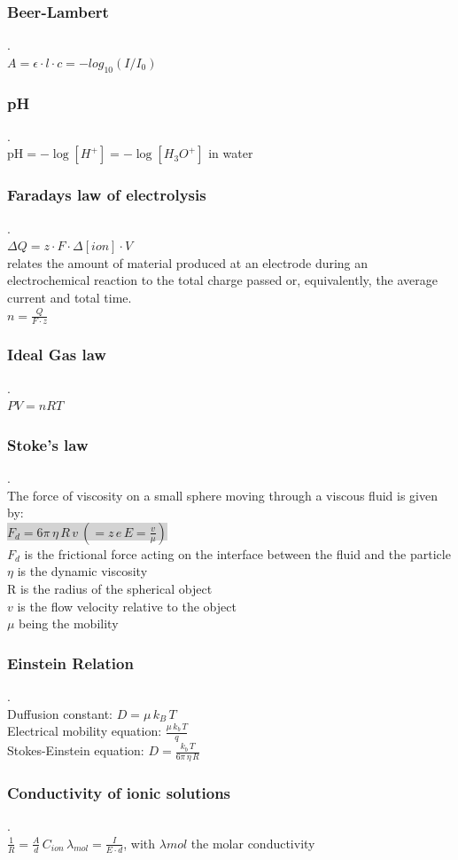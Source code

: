 \documentclass[9pt]{article}
\newcommand{\grey}[1]{\setlength{\fboxsep}{0pt}\colorbox{lightgrey}{#1}}
\begin{document}
\begin{multicols}{2}
\subsubsection{Beer-Lambert}.\\
$A=\epsilon\cdot l\cdot c=-log_{10}(I/I_0)$\\
\subsubsection{pH}.\\
pH$= -\log [H^+] =-\log [H_3 O^+] $ in water\\
\subsubsection{Faradays law of electrolysis} \label{Faradays law of electrolysis}.\\
$\Delta Q= z\cdot F\cdot \Delta [ion]\cdot V$\\
relates the amount of material produced at an electrode during an electrochemical reaction to the total charge passed or, equivalently, the average current and total time.\\
$n=\frac{Q}{F\cdot z}$
\subsubsection{Ideal Gas law}.\\
$PV=nRT$\\
\subsubsection{Stoke's law}.\\
The force of viscosity on a small sphere moving through a viscous fluid is given by:\\
 \grey{$F_{d}=6\pi \,\eta \,R\,v\  (= z\, e\, E=\frac{v}{\mu})$}\\
$F_d$ is the frictional force acting on the interface between the fluid and the particle\\
$\eta $ is the dynamic viscosity \\
R is the radius of the spherical object\\
$v$ is the flow velocity relative to the object\\
$\mu$ being the mobility\\
\subsubsection{Einstein Relation}.\\
Duffusion constant: $D= \mu \,  k_B\, T$\\
Electrical mobility equation: $\frac{\mu \, k_b\, T }{q}$\\
Stokes-Einstein equation: $D=\frac{k_b\, T}{6\pi \,\eta \,R}$\\
\subsubsection{Conductivity of ionic solutions}.\\
$\frac{1}{R}=\frac{A}{d}\, C_{ion}\, \lambda _{mol}=\frac{I}{E\cdot d}$, 
with $\lambda {mol}$ the molar conductivity
\end{multicols}
\end{document}
